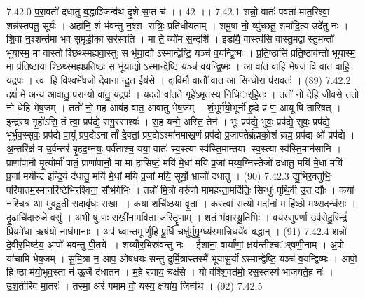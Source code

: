 7.42.0
प॒रा॒वतो॑ दधातु ब॒द्धाञ्जिन्व॑थ दृ॒शे स॒प्त च॑ ।। 42 ।।
7.42.1
शन्नो॒ वातः॑ पवतां मात॒रिश्वा॒ शन्न॑स्तपतु॒ सूर्यः॑ । अहा॑नि॒ शं भ॑वन्तु न॒श्श रात्रिः॒ प्रति॑धीयताम् । शमु॒षा नो॒ व्यु॑च्छतु॒ शमा॑दि॒त्य उदे॑तु नः । शि॒वा न॒श्शन्त॑मा भव सुमृडी॒का सर॑स्वति । मा ते॒ व्यो॑म स॒न्दृशि॑ । इडा॑यै॒ वास्त्व॑सि वास्तु॒मद्वास्तु॒मन्तो॑ भूयास्म॒ मा वास्तोश्छिथ्स्मह्यवा॒स्तुः स भू॑या॒द्योऽस्मान्द्वेष्टि॒ यञ्च॑ व॒यन्द्वि॒ष्मः । प्र॒ति॒ष्ठासि॑ प्रति॒ष्ठाव॑न्तो भूयास्म॒ मा प्र॑ति॒ष्ठायाश्छिथ्स्मह्यप्रति॒ष्ठः स भू॑या॒द्योऽस्मान्द्वेष्टि॒ यञ्च॑ व॒यन्द्वि॒ष्मः । आ वा॑त वाहि भेष॒जं वि वा॑त वाहि॒ यद्रपः॑ । त्व हि वि॒श्वभे॑षजो दे॒वानान्दू॒त ईय॑से । द्वावि॒मौ वातौ॑ वात॒ आ सिन्धो॑रा प॑रा॒वतः॑ । (89)
7.42.2
दक्षं॑ मे अ॒न्य आ॒वातु॒ परा॒न्यो वा॑तु॒ यद्रपः॑ । यद॒दो वा॑तते गृ॒हे॑ऽमृत॑स्य नि॒धिर््हि॒तः । ततो॑ नो देहि जी॒वसे॒ ततो॑ नो धेहि भेष॒जम् । ततो॑ नो॒ मह॒ आव॑ह॒ वात॒ आवा॑तु भेष॒जम् । शं॒भूर्म॑यो॒भूर्नो॑ हृ॒दे प्र ण॒ आयू॑षि तारिषत् । इन्द्र॑स्य गृ॒हो॑ऽसि॒ तं त्वा॒ प्रप॑द्ये॒ सगु॒स्साश्वः॑ । स॒ह यन्मे॒ अस्ति॒ तेन॑ । भूः प्रप॑द्ये॒ भुवः॒ प्रप॑द्ये॒ सुवः॒ प्रप॑द्ये॒ भूर्भुव॒स्सुवः॒ प्रप॑द्ये वा॒युं प्रप॒द्येऽनार्तां दे॒वतां॒ प्रप॒द्येऽश्मा॑नमाख॒णं प्रप॑द्ये प्र॒जाप॑तेर्ब्रह्मको॒शं ब्रह्म॒ प्रप॑द्य॒ ओं प्रप॑द्ये । अ॒न्तरि॑क्षं म उ॒र्व॑न्तरं॑ बृ॒हद॒ग्नयः॒ पर्व॑ताश्च॒ यया॒ वातः॑ स्व॒स्त्या स्व॑स्ति॒मान्तया स्व॒स्त्या स्व॑स्ति॒मान॑सानि । प्राणा॑पानौ मृ॒त्योर्मा॑ पातं॒ प्राणा॑पानौ॒ मा मा॑ हासिष्टं॒ मयि॑ मे॒धां मयि॑ प्र॒जां मय्य॒ग्निस्तेजो॑ दधातु॒ मयि॑ मे॒धां मयि॑ प्र॒जां मयीन्द्र॑ इन्द्रि॒यं द॑धातु॒ मयि॑ मे॒धां मयि॑ प्र॒जां मयि॒ सूर्यो॒ भ्राजो॑ दधातु । (90)
7.42.3
द्यु॒भिर॒क्तुभिः॒ परि॑पातम॒स्मानरि॑ष्टेभिरश्विना॒ सौभ॑गेभिः । तन्नो॑ मि॒त्रो वरु॑णो मामहन्ता॒मदि॑तिः॒ सिन्धुः॑ पृथि॒वी उ॒त द्यौः । कया॑ नश्चि॒त्र आ भु॑वदू॒ती स॒दावृ॑धः॒ सखा । कया॒ शचि॑ष्ठया वृ॒ता । कस्त्वा॑ स॒त्यो मदा॑नां॒ महि॑ष्ठो मथ्स॒दन्ध॑सः । दृ॒ढाचि॑दा॒रुजे॒ वसु॑ । अ॒भी षु णः॒ सखी॑नामवि॒ता ज॑रितॄ॒णाम् । श॒तं भ॑वास्यू॒तिभिः॑ । वय॑स्सुप॒र्णा उप॑सेदु॒रिन्द्रं॑ प्रि॒यमे॑धा॒ ऋष॑यो॒ नाध॑मानाः । अप॑ ध्वा॒न्तमूर्णु॒हि पू॒र्धि चक्षु॑र्मुमु॒ग्ध्य॑स्मान्नि॒धये॑व ब॒द्धान् । (91)
7.42.4
शन्नो॑ दे॒वीर॒भिष्ट॑य॒ आपो॑ भवन्तु पी॒तये । शय्योँर॒भिस्र॑वन्तु नः । ईशा॑ना॒ वार्या॑णां॒ क्षय॑न्तीश्चर््षणी॒नाम् । अ॒पो या॑चामि भेष॒जम् । सु॒मि॒त्रा न॒ आप॒ ओष॑धयः सन्तु दुर्मि॒त्रास्तस्मै॑ भूयासु॒र्योऽस्मान्द्वेष्टि॒ यञ्च॑ व॒यन्द्वि॒ष्मः । आपो॒ हि ष्ठा म॑यो॒भुव॒स्ता न॑ ऊ॒र्जे द॑धातन । म॒हे रणा॑य॒ चक्ष॑से । यो व॑श्शि॒वत॑मो॒ रस॒स्तस्य॑ भाजयते॒ह नः॑ । उ॒श॒तीरि॑व मा॒तरः॑ । तस्मा॒ अरं॑ गमाम वो॒ यस्य॒ क्षया॑य॒ जिन्व॑थ । (92)
7.42.5
